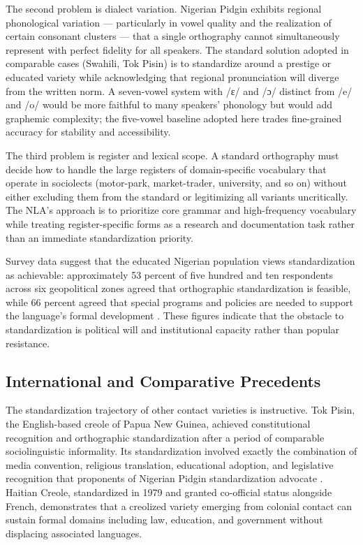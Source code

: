 \documentclass[12pt]{article}
\begin{document}
The second problem is dialect variation. Nigerian Pidgin exhibits regional phonological variation --- particularly in vowel quality and the realization of certain consonant clusters --- that a single orthography cannot simultaneously represent with perfect fidelity for all speakers. The standard solution adopted in comparable cases (Swahili, Tok Pisin) is to standardize around a prestige or educated variety while acknowledging that regional pronunciation will diverge from the written norm. A seven-vowel system with /ɛ/ and /ɔ/ distinct from /e/ and /o/ would be more faithful to many speakers' phonology but would add graphemic complexity; the five-vowel baseline adopted here trades fine-grained accuracy for stability and accessibility.

The third problem is register and lexical scope. A standard orthography must decide how to handle the large registers of domain-specific vocabulary that operate in sociolects (motor-park, market-trader, university, and so on) without either excluding them from the standard or legitimizing all variants uncritically. The NLA's approach is to prioritize core grammar and high-frequency vocabulary while treating register-specific forms as a research and documentation task rather than an immediate standardization priority.

Survey data suggest that the educated Nigerian population views standardization as achievable: approximately 53 percent of five hundred and ten respondents across six geopolitical zones agreed that orthographic standardization is feasible, while 66 percent agreed that special programs and policies are needed to support the language's formal development \cite{AjaKilani2024}. These figures indicate that the obstacle to standardization is political will and institutional capacity rather than popular resistance.

\subsection{International and Comparative Precedents}

The standardization trajectory of other contact varieties is instructive. Tok Pisin, the English-based creole of Papua New Guinea, achieved constitutional recognition and orthographic standardization after a period of comparable sociolinguistic informality. Its standardization involved exactly the combination of media convention, religious translation, educational adoption, and legislative recognition that proponents of Nigerian Pidgin standardization advocate \cite{Holm1988}. Haitian Creole, standardized in 1979 and granted co-official status alongside French, demonstrates that a creolized variety emerging from colonial contact can sustain formal domains including law, education, and government without displacing associated languages.
\end{document}
